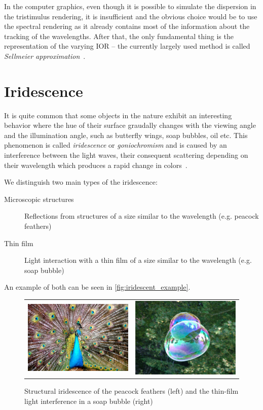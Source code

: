 In the computer graphics, even though it is possible to simulate the dispersion in the tristimulus rendering, it is insufficient and the obvious choice would be to use the spectral rendering as it already contains most of the information about the tracking of the wavelengths. After that, the only fundamental thing is the representation of the varying IOR -- the currently largely used method is called \emph{Sellmeier approximation}~\cite{wilkie2002tone}.

\section{Iridescence}

It is quite common that some objects in the nature exhibit an interesting behavior where the hue of their surface graudally changes with the viewing angle and the illumination angle, such as butterfly wings, soap bubbles, oil etc. This phenomenon is called \emph{iridescence} or \emph{goniochromism} and is caused by an interference between the light waves, their consequent scattering depending on their wavelength which produces a rapid change in colors~\cite{belcour2017practical}.

We distinguish two main types of the iridescence:

\begin{description}
	\item[Microscopic structures] Reflections from structures of a size similar to the wavelength (e.g. peacock feathers)
	\item[Thin film] Light interaction with a thin film of a size similar to the wavelength (e.g. soap bubble)
\end{description}

An example of both can be seen in \autoref{fig:iridescent_example}.

\begin{figure}
	\centering
	\begin{tabular}{cc}
		\includegraphics[width=0.4\linewidth]{img/iridescent_peacock.jpg}
		&
		\includegraphics[width=0.4\linewidth]{img/iridescent_soap.jpg}
	\end{tabular}
	\caption[Irid example]{Structural iridescence of the peacock feathers (left) and the thin-film light interference in a soap bubble (right)\footnotemark}
	\label{fig:iridescent_example}
\end{figure}

